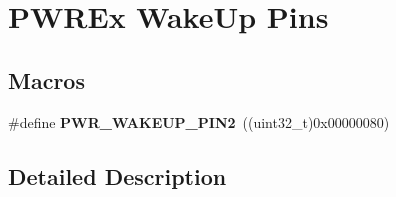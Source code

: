 \hypertarget{group___p_w_r_ex___wake_up___pins}{}\section{P\+W\+R\+Ex Wake\+Up Pins}
\label{group___p_w_r_ex___wake_up___pins}
\subsection*{Macros}
\begin{DoxyCompactItemize}
\item 
\#define {\bfseries P\+W\+R\+\_\+\+W\+A\+K\+E\+U\+P\+\_\+\+P\+I\+N2}~((uint32\+\_\+t)0x00000080)\hypertarget{group___p_w_r_ex___wake_up___pins_ga0c718de5967a8d2cec63d0b5fe0b2ada}{}\label{group___p_w_r_ex___wake_up___pins_ga0c718de5967a8d2cec63d0b5fe0b2ada}

\end{DoxyCompactItemize}


\subsection{Detailed Description}
